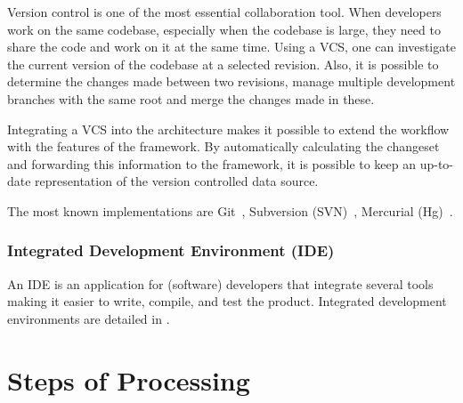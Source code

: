 Version control is one of the most essential collaboration tool. When developers work on the same codebase, especially when the codebase is large, they need to share the code and work on it at the same time. Using a VCS, one can investigate the current version of the codebase at a selected revision. Also, it is possible to determine the changes made between two revisions, manage multiple development branches with the same root and merge the changes made in these.

Integrating a VCS into the architecture makes it possible to extend the workflow with the features of the framework. By automatically calculating the changeset and forwarding this information to the framework, it is possible to keep an up-to-date representation of the version controlled data source.

The most known implementations are Git~\cite{git}, Subversion (SVN)~\cite{svn}, Mercurial (Hg)~\cite{hg}.

\subsubsection{Integrated Development Environment (IDE)}
An IDE is an application for (software) developers that integrate several tools making it easier to write, compile, and test the product. Integrated development environments are detailed in .

\section{Steps of Processing}
